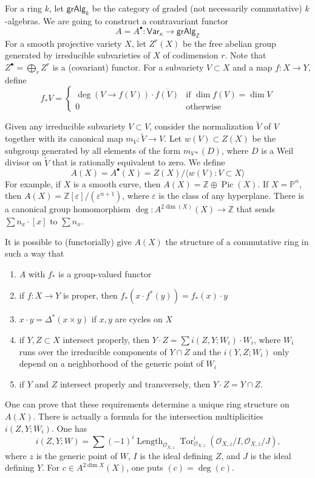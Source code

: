 \documentclass{article}
\newcommand{\dZ}{\mathbb{Z}}
\newcommand{\vark}{\mathsf{Var}_\kappa}
\begin{document}
For a ring $k$, let $\mathsf{grAlg}_k$ be the category of graded (not 
necessarily commutative) $k$-algebras. We are going to construct a 
contravariant functor 
\[
  A = A^\bullet : \vark \to \mathsf{grAlg}_\dZ
\]
For a smooth projective variety $X$, let $Z^r(X)$ be the free abelian group 
generated by irreducible subvarieties of $X$ of codimension $r$. Note that 
$Z^\bullet = \bigoplus_r Z^r$ is a (covariant) functor. For a subvariety 
$V\subset X$ and a map $f:X\to Y$, define 
\[
  f_* V = \begin{cases}
            \deg\left(V\to f(V)\right)\cdot \overline{f(V)} & \text{if $\dim f(V)=\dim V$} \\
            0                                               & \text{otherwise}
          \end{cases}
\]

Given any irreducible subvariety $V\subset V$, consider the normalization 
$\widetilde V$ of $V$ together with its canonical map $m_V:\widetilde V\to V$. 
Let $w(V)\subset Z(X)$ be the subgroup generated by all elements of the form 
$m_{V *}(D)$, where $D$ is a Weil divisor on $\widetilde V$ that is rationally 
equivalent to zero. We define 
\[
  A(X) = A^\bullet(X) = Z(X) / \langle w(V) : V\subset X\rangle
\]
For example, if $X$ is a smooth curve, then 
$A(X) = \dZ\oplus \operatorname{Pic}(X)$. If $X=\mathbb{P}^n$, then 
$A(X) = \dZ[\varepsilon]/(\varepsilon^{n+1})$, where $\varepsilon$ is the class 
of any hyperplane. There is a canonical group homomorphism 
$\deg:A^{2\dim (X)}(X)\to \dZ$ that sends $\sum n_x\cdot [x]$ to $\sum n_x$. 

It is possible to (functorially) give $A(X)$ the structure of a commutative 
ring in such a way that 
\begin{enumerate}
  \item $A$ with $f_*$ is a group-valued functor
  \item if $f:X\to Y$ is proper, then $f_*(x\cdot f^*(y)) = f_*(x)\cdot y$
  \item $x\cdot y = \Delta^*(x\times y)$ if $x,y$ are cycles on $X$
  \item if $Y,Z\subset X$ intersect properly, then 
    $Y\cdot Z=\sum i(Z,Y;W_i)\cdot W_i$, where $W_i$ runs over the irreducible 
    components of $Y\cap Z$ and the $i(Y,Z;W_i)$ only depend on a neighborhood 
    of the generic point of $W_i$
  \item if $Y$ and $Z$ intersect properly and transversely, then 
    $Y\cdot Z=Y\cap Z$.
\end{enumerate}
One can prove that these requirements determine a unique ring structure on 
$A(X)$. There is actually a formula for the intersection multiplicities 
$i(Z,Y;W_i)$. One has 
\[
  i(Z,Y; W) = \sum (-1)^i \operatorname{Length}_{\mathscr O_{X,z}} \operatorname{Tor}_{\mathscr{O}_{X,z}}^i\left(\mathscr O_{X,z}/I,\mathscr O_{X,z}/J\right)\text{,}
\]
where $z$ is the generic point of $W$, $I$ is the ideal defining $Z$, and $J$ is 
the ideal defining $Y$. For $c\in A^{2\dim X}(X)$, one puts $(c)=\deg(c)$. 
\end{document}
